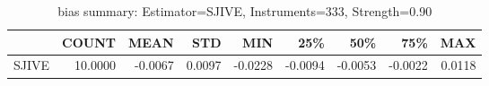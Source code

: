 \begin{table}[ht]
\centering
\caption{bias summary: Estimator=SJIVE, Instruments=333, Strength=0.90}
\begin{tabular}{lrrrrrrrr}
\toprule
 & COUNT & MEAN & STD & MIN & 25\% & 50\% & 75\% & MAX \\
\midrule
SJIVE & 10.0000 & -0.0067 & 0.0097 & -0.0228 & -0.0094 & -0.0053 & -0.0022 & 0.0118 \\
\bottomrule
\end{tabular}
\end{table}
